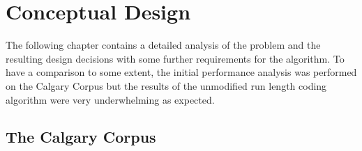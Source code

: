 
\chapter{Conceptual Design}
\label{ch:Analysis}

\par{
The following chapter contains a detailed analysis of the problem and the resulting design decisions with some further requirements for the algorithm. To have a comparison to some extent, the initial performance analysis was performed on the Calgary Corpus but the results of the unmodified run length coding algorithm were very underwhelming as expected.
}

\section{The Calgary Corpus}
